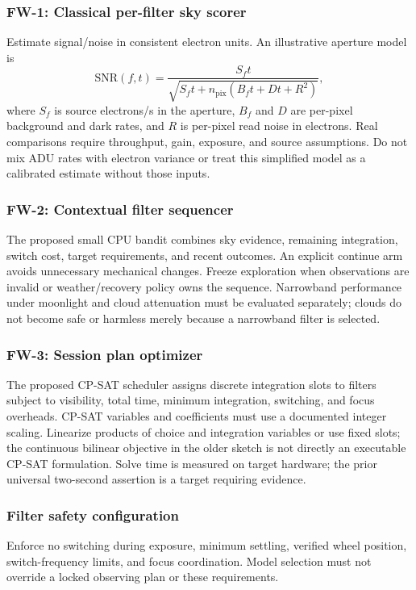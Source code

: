 \documentclass[11pt,a4paper]{article}
\begin{document}
\subsubsection{FW-1: Classical per-filter sky scorer}
Estimate signal/noise in consistent electron units. An illustrative aperture
model is
\[
\mathrm{SNR}(f,t)=\frac{S_f t}
 {\sqrt{S_f t+n_{\mathrm{pix}}(B_f t+D t+R^2)}} ,
\]
where $S_f$ is source electrons/s in the aperture, $B_f$ and $D$ are per-pixel
background and dark rates, and $R$ is per-pixel read noise in electrons.
Real comparisons require throughput, gain, exposure, and source assumptions.
Do not mix ADU rates with electron variance or treat this simplified model as
a calibrated estimate without those inputs.

\subsubsection{FW-2: Contextual filter sequencer}
The proposed small CPU bandit combines sky evidence, remaining integration,
switch cost, target requirements, and recent outcomes. An explicit continue arm
avoids unnecessary mechanical changes. Freeze exploration when observations
are invalid or weather/recovery policy owns the sequence. Narrowband performance
under moonlight and cloud attenuation must be evaluated separately; clouds do
not become safe or harmless merely because a narrowband filter is selected.

\subsubsection{FW-3: Session plan optimizer}
The proposed CP-SAT scheduler assigns discrete integration slots to filters
subject to visibility, total time, minimum integration, switching, and focus
overheads. CP-SAT variables and coefficients must use a documented integer
scaling. Linearize products of choice and integration variables or use fixed
slots; the continuous bilinear objective in the older sketch is not directly
an executable CP-SAT formulation. Solve time is measured on target hardware;
the prior universal two-second assertion is a target requiring evidence.

\subsubsection{Filter safety configuration}
Enforce no switching during exposure, minimum settling, verified wheel
position, switch-frequency limits, and focus coordination. Model selection
must not override a locked observing plan or these requirements.
\end{document}
